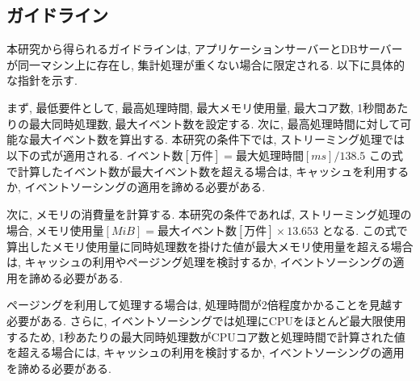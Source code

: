 \documentclass[../../main]{subfiles}
\begin{document}
    \subsection{ガイドライン}\label{subsec:consideration-guideline}

    本研究から得られるガイドラインは, アプリケーションサーバーとDBサーバーが同一マシン上に存在し, 集計処理が重くない場合に限定される. 以下に具体的な指針を示す.

    まず, 最低要件として, 最高処理時間, 最大メモリ使用量, 最大コア数, 1秒間あたりの最大同時処理数, 最大イベント数を設定する. 次に, 最高処理時間に対して可能な最大イベント数を算出する. 本研究の条件下では, ストリーミング処理では以下の式が適用される. $ イベント数[万件] = 最大処理時間[ms] / 138.5 $ この式で計算したイベント数が最大イベント数を超える場合は, キャッシュを利用するか, イベントソーシングの適用を諦める必要がある.

    次に, メモリの消費量を計算する. 本研究の条件であれば, ストリーミング処理の場合, $ メモリ使用量[MiB] = 最大イベント数[万件] \times 13.653 $ となる. この式で算出したメモリ使用量に同時処理数を掛けた値が最大メモリ使用量を超える場合は, キャッシュの利用やページング処理を検討するか, イベントソーシングの適用を諦める必要がある.

    ページングを利用して処理する場合は, 処理時間が2倍程度かかることを見越す必要がある. さらに, イベントソーシングでは処理にCPUをほとんど最大限使用するため, 1秒あたりの最大同時処理数がCPUコア数と処理時間で計算された値を超える場合には, キャッシュの利用を検討するか, イベントソーシングの適用を諦める必要がある.

    \clearpage
\end{document}
